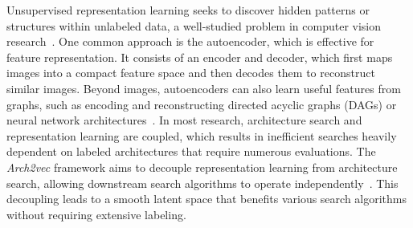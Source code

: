 \documentclass{article} %
\begin{document}
Unsupervised representation learning seeks to discover hidden patterns or structures within unlabeled data, a well-studied problem in computer vision research~\citep{radford2015unsupervised}. One common approach is the autoencoder, which is effective for feature representation. It consists of an encoder and decoder, which first maps images into a compact feature space and then decodes them to reconstruct similar images. Beyond images, autoencoders can also learn useful features from graphs, such as encoding and reconstructing directed acyclic graphs (DAGs) or neural network architectures~\citep{yan2020does, zhang2019d, pan2018adversarially, wang2016structural}. In most research, architecture search and representation learning are coupled, which results in inefficient searches heavily dependent on labeled architectures that require numerous evaluations. The \textit{Arch2vec} framework aims to decouple representation learning from architecture search, allowing downstream search algorithms to operate independently~\citep{yan2020does}. This decoupling leads to a smooth latent space that benefits various search algorithms without requiring extensive labeling. %
\end{document}
